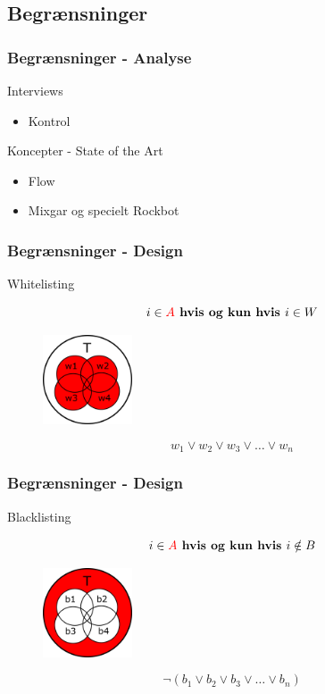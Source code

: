 \subsection{Begrænsninger}
\begin{frame}
	\frametitle{Begrænsninger - Analyse}
	Interviews
	\begin{itemize}
		\item Kontrol
	\end{itemize}
	Koncepter - State of the Art
	\begin{itemize}
		\item Flow
		\item Mixgar og specielt Rockbot
	\end{itemize}
\end{frame}

\begin{frame}
	\frametitle{Begrænsninger - Design}
	Whitelisting
	
	\begin{equation}
		i \in \textcolor[rgb]{1,0,0}{A} \textbf{ hvis og kun hvis } i \in W
	\end{equation}
	
	\begin{figure}
    \centering
    \includegraphics[width=100px]{slides/Jens/whitelist}
  \end{figure}
	
	\begin{equation}
		w_1 \vee w_2 \vee w_3 \vee \dots \vee w_n
	\end{equation}
\end{frame}

\begin{frame}
	\frametitle{Begrænsninger - Design}
	Blacklisting
	
	\begin{equation}
		i \in \textcolor[rgb]{1,0,0}{A} \textbf{ hvis og kun hvis } i \notin B
	\end{equation}
	
	\begin{figure}
    \centering
    \includegraphics[width=100px]{slides/Jens/blacklist}
  \end{figure}
	
	\begin{equation}
		\neg(b_1 \vee b_2 \vee b_3 \vee \dots \vee b_n)
	\end{equation}
\end{frame}

